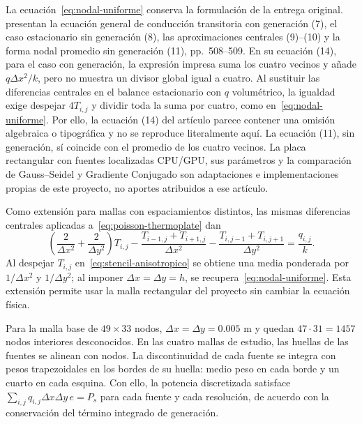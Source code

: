 La ecuaci\'on~\eqref{eq:nodal-uniforme} conserva la formulaci\'on de la entrega original. \citet{santos2022finite} presentan la ecuaci\'on general de conducci\'on transitoria con generaci\'on (7), el caso estacionario sin generaci\'on (8), las aproximaciones centrales (9)--(10) y la forma nodal promedio sin generaci\'on (11), pp.~508--509. En su ecuaci\'on (14), para el caso con generaci\'on, la expresi\'on impresa suma los cuatro vecinos y a\~nade $q\Delta x^2/k$, pero no muestra un divisor global igual a cuatro. Al sustituir las diferencias centrales en el balance estacionario con $q$ volum\'etrico, la igualdad exige despejar $4T_{i,j}$ y dividir toda la suma por cuatro, como en~\eqref{eq:nodal-uniforme}. Por ello, la ecuaci\'on (14) del art\'iculo parece contener una omisi\'on algebraica o tipogr\'afica y no se reproduce literalmente aqu\'i. La ecuaci\'on (11), sin generaci\'on, s\'i coincide con el promedio de los cuatro vecinos. La placa rectangular con fuentes localizadas CPU/GPU, sus par\'ametros y la comparaci\'on de Gauss--Seidel y Gradiente Conjugado son adaptaciones e implementaciones propias de este proyecto, no aportes atribuidos a ese art\'iculo.

Como extensi\'on para mallas con espaciamientos distintos, las mismas diferencias centrales aplicadas a~\eqref{eq:poisson-thermoplate} dan
\begin{equation}
\left(\frac{2}{\Delta x^2}+\frac{2}{\Delta y^2}\right)T_{i,j}
-\frac{T_{i-1,j}+T_{i+1,j}}{\Delta x^2}
-\frac{T_{i,j-1}+T_{i,j+1}}{\Delta y^2}
=\frac{q_{i,j}}{k}.
\label{eq:stencil-anisotropico}
\end{equation}
Al despejar $T_{i,j}$ en~\eqref{eq:stencil-anisotropico} se obtiene una media ponderada por $1/\Delta x^2$ y $1/\Delta y^2$; al imponer $\Delta x=\Delta y=h$, se recupera~\eqref{eq:nodal-uniforme}. Esta extensi\'on permite usar la malla rectangular del proyecto sin cambiar la ecuaci\'on f\'isica.

Para la malla base de $49\times33$ nodos, $\Delta x=\Delta y=0.005$ m y quedan $47\cdot31=1457$ nodos interiores desconocidos. En las cuatro mallas de estudio, las huellas de las fuentes se alinean con nodos. La discontinuidad de cada fuente se integra con pesos trapezoidales en los bordes de su huella: medio peso en cada borde y un cuarto en cada esquina. Con ello, la potencia discretizada satisface $\sum_{i,j}q_{i,j}\Delta x\Delta y\,e=P_s$ para cada fuente y cada resoluci\'on, de acuerdo con la conservaci\'on del t\'ermino integrado de generaci\'on.

